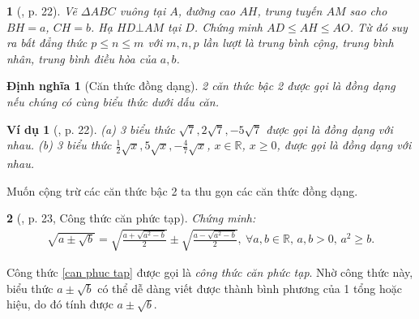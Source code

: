 \documentclass{article}
\newtheorem{baitoan}{}%
\newtheorem{dinhnghia}{Định nghĩa}
\newtheorem{vidu}{Ví dụ}
\begin{document}
\begin{baitoan}[\cite{Binh_boi_duong_Toan_9_tap_1}, p. 22]
	Vẽ $\Delta ABC$ vuông tại $A$, đường cao $AH$, trung tuyến $AM$ sao cho $BH = a$, $CH = b$. Hạ $HD\bot AM$ tại $D$. Chứng minh $AD\le AH\le AO$. Từ đó suy ra bất đẳng thức $p\le n\le m$ với $m,n,p$ lần lượt là trung bình cộng, trung bình nhân, trung bình điều hòa của $a,b$.
	\begin{center}
	\end{center}
\end{baitoan}

\begin{dinhnghia}[Căn thức đồng dạng]
	2 căn thức bậc 2 được gọi là {\rm đồng dạng} nếu chúng có cùng biểu thức dưới dấu căn.
\end{dinhnghia}

\begin{vidu}[\cite{Binh_boi_duong_Toan_9_tap_1}, p. 22]
	(a) 3 biểu thức $\sqrt{7},2\sqrt{7},-5\sqrt{7}$ được gọi là {\rm đồng dạng} với nhau. (b) 3 biểu thức $\frac{1}{2}\sqrt{x},5\sqrt{x},-\frac{4}{7}\sqrt{x}$, $x\in\mathbb{R}$, $x\ge0$, được gọi là {\rm đồng dạng} với nhau.
\end{vidu}
Muốn cộng trừ các căn thức bậc 2 ta thu gọn các căn thức đồng dạng.

\begin{baitoan}[\cite{Binh_boi_duong_Toan_9_tap_1}, p. 23, Công thức căn phức tạp]
	Chứng minh:
	\begin{align}
		\label{can phuc tap}
		\sqrt{a\pm\sqrt{b}} = \sqrt{\frac{a + \sqrt{a^2 - b}}{2}}\pm\sqrt{\frac{a - \sqrt{a^2 - b}}{2}},\ \forall a,b\in\mathbb{R},\,a,b > 0,\,a^2\ge b.
	\end{align}
\end{baitoan}
Công thức \eqref{can phuc tap} được gọi là \textit{công thức căn phức tạp}. Nhờ công thức này, biểu thức $a\pm\sqrt{b}$ có thể dễ dàng viết được thành bình phương của 1 tổng hoặc hiệu, do đó tính được $a\pm\sqrt{b}$.
\end{document}
